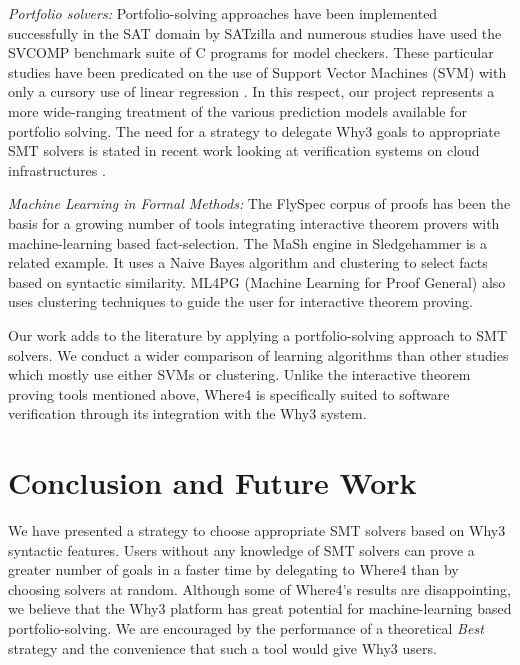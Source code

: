 \documentclass[runningheads,a4paper]{llncs}
\begin{document}
\textit{Portfolio solvers:} Portfolio-solving approaches have been implemented successfully in the SAT domain by SATzilla \cite{Satzilla} and numerous studies \cite{MUX} \cite{DPVZ15:CAV} have used the SVCOMP \cite{SVCOMP} benchmark suite of C programs for model checkers. These particular studies have been predicated on the use of Support Vector Machines (SVM) with only a cursory use of linear regression \cite{MUX}. In this respect, our project represents a more wide-ranging treatment of the various prediction models available for portfolio solving. The need for a strategy to delegate \textsf{Why3} goals to appropriate SMT solvers is stated in recent work looking at verification systems on cloud infrastructures \cite{rodinplugin}.

\textit{Machine Learning in Formal Methods:} 
The FlySpec \cite{Flyspec} corpus of proofs has been the basis for a growing number of tools integrating interactive theorem provers with machine-learning based fact-selection. The MaSh engine in Sledgehammer \cite{Sledgehammer} is a related example. It uses a Naive Bayes algorithm and clustering to select facts based on syntactic similarity. ML4PG (Machine Learning for Proof General) \cite{ML4PG} also uses clustering techniques to guide the user for interactive theorem proving.

Our work adds to the literature by applying a portfolio-solving approach to SMT solvers. We conduct a wider comparison of learning algorithms than other studies which mostly use either SVMs or clustering. Unlike the interactive theorem proving tools mentioned above, \textsf{Where4} is specifically suited to software verification through its integration with the \textsf{Why3} system.

\section{Conclusion and Future Work}

We have presented a strategy to choose appropriate SMT solvers based on \textsf{Why3} syntactic features. Users without any knowledge of SMT solvers can prove a greater number of goals in a faster time by delegating to \textsf{Where4} than by choosing solvers at random. Although some of \textsf{Where4}'s results are disappointing, we believe that the \textsf{Why3} platform has great potential for machine-learning based portfolio-solving. We are encouraged by the performance of a theoretical \textit{Best} strategy and the convenience that such a tool would give \textsf{Why3} users.
\end{document}

